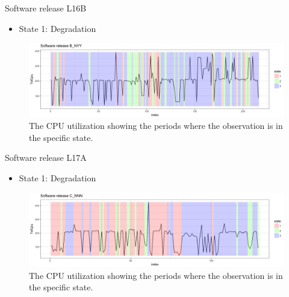 \documentclass{beamer}
\begin{document}
\begin{frame}
Software release L16B

\begin{itemize}
\item State 1: Degradation
\end{itemize}

\begin{figure}
\includegraphics[width=1\linewidth]{L16B_NYY1}
\caption{The CPU utilization showing the periods where the observation is in the specific state.}
\end{figure}

\end{frame}

\begin{frame}
Software release L17A

\begin{itemize}
\item State 1: Degradation
\end{itemize}

\begin{figure}
\includegraphics[width=1\linewidth]{L17A_NNN1}
\caption{The CPU utilization showing the periods where the observation is in the specific state.}
\end{figure}

\end{frame}
\end{document}
